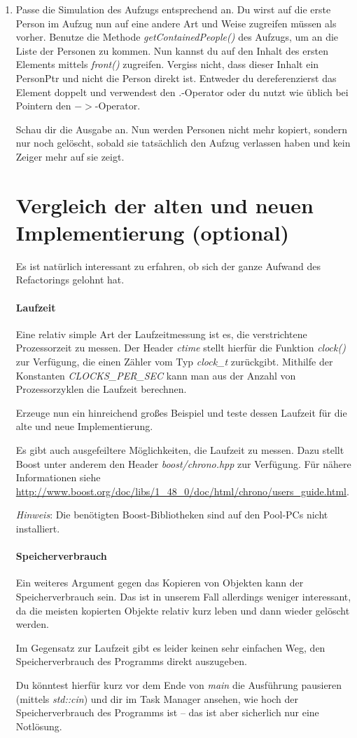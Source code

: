 \documentclass[
  accentcolor=tud1c,	%
  colorbacktitle,		%
  inverttitle,			%
  german,				%
  twoside
]{tudexercise}
\begin{document}
\begin{enumerate}
\item
Passe die Simulation des Aufzugs entsprechend an.
Du wirst auf die erste Person im Aufzug nun auf eine andere Art und Weise zugreifen müssen als vorher.
Benutze die Methode \emph{getContainedPeople()} des Aufzugs, um an die Liste der Personen zu kommen.
Nun kannst du auf den Inhalt des ersten Elements mittels \emph{front()} zugreifen.
Vergiss nicht, dass dieser Inhalt ein PersonPtr und nicht die Person direkt ist.
Entweder du dereferenzierst das Element doppelt und verwendest den $.$-Operator oder du nutzt wie üblich bei Pointern den $->$-Operator.

Schau dir die Ausgabe an.
Nun werden Personen nicht mehr kopiert, sondern nur noch gelöscht, sobald sie tatsächlich den Aufzug verlassen haben und kein Zeiger mehr auf sie zeigt.

\section{Vergleich der alten und neuen Implementierung (optional)}

Es ist natürlich interessant zu erfahren, ob sich der ganze Aufwand des Refactorings gelohnt hat.

\paragraph{Laufzeit}
Eine relativ simple Art der Laufzeitmessung ist es, die verstrichtene Prozessorzeit zu messen.
Der Header \emph{ctime} stellt hierfür die Funktion \emph{clock()} zur Verfügung, die einen Zähler vom Typ \emph{clock\_t} zurückgibt.
Mithilfe der Konstanten \emph{CLOCKS\_PER\_SEC} kann man aus der Anzahl von Prozessorzyklen die Laufzeit berechnen.

Erzeuge nun ein hinreichend großes Beispiel und teste dessen Laufzeit für die alte und neue Implementierung.

Es gibt auch ausgefeiltere Möglichkeiten, die Laufzeit zu messen.
Dazu stellt Boost unter anderem den Header \emph{boost/chrono.hpp} zur Verfügung.
Für nähere Informationen siehe \url{http://www.boost.org/doc/libs/1_48_0/doc/html/chrono/users_guide.html}.

\emph{Hinweis}: Die benötigten Boost-Bibliotheken sind auf den Pool-PCs nicht installiert.

\paragraph{Speicherverbrauch}
Ein weiteres Argument gegen das Kopieren von Objekten kann der Speicherverbrauch sein.
Das ist in unserem Fall allerdings weniger interessant, da die meisten kopierten Objekte relativ kurz leben und dann wieder gelöscht werden.

Im Gegensatz zur Laufzeit gibt es leider keinen sehr einfachen Weg, den Speicherverbrauch des Programms direkt auszugeben.

Du könntest hierfür kurz vor dem Ende von \emph{main} die Ausführung pausieren (mittels \emph{std::cin}) und dir im Task Manager ansehen, wie hoch der Speicherverbrauch des Programms ist -- das ist aber sicherlich nur eine Notlösung.

\end{enumerate}
\end{document}
